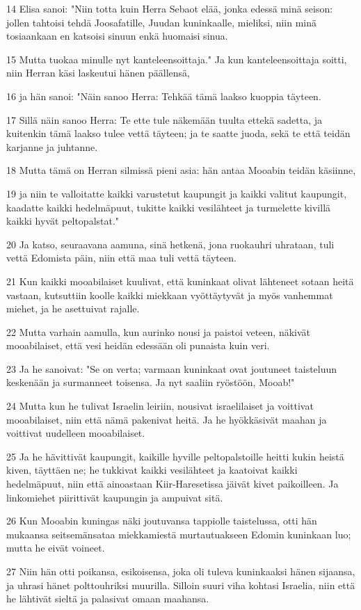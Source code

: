 \par 14 Elisa sanoi: "Niin totta kuin Herra Sebaot elää, jonka edessä minä seison: jollen tahtoisi tehdä Joosafatille, Juudan kuninkaalle, mieliksi, niin minä tosiaankaan en katsoisi sinuun enkä huomaisi sinua.
\par 15 Mutta tuokaa minulle nyt kanteleensoittaja." Ja kun kanteleensoittaja soitti, niin Herran käsi laskeutui hänen päällensä,
\par 16 ja hän sanoi: "Näin sanoo Herra: Tehkää tämä laakso kuoppia täyteen.
\par 17 Sillä näin sanoo Herra: Te ette tule näkemään tuulta ettekä sadetta, ja kuitenkin tämä laakso tulee vettä täyteen; ja te saatte juoda, sekä te että teidän karjanne ja juhtanne.
\par 18 Mutta tämä on Herran silmissä pieni asia: hän antaa Mooabin teidän käsiinne,
\par 19 ja niin te valloitatte kaikki varustetut kaupungit ja kaikki valitut kaupungit, kaadatte kaikki hedelmäpuut, tukitte kaikki vesilähteet ja turmelette kivillä kaikki hyvät peltopalstat."
\par 20 Ja katso, seuraavana aamuna, sinä hetkenä, jona ruokauhri uhrataan, tuli vettä Edomista päin, niin että maa tuli vettä täyteen.
\par 21 Kun kaikki mooabilaiset kuulivat, että kuninkaat olivat lähteneet sotaan heitä vastaan, kutsuttiin koolle kaikki miekkaan vyöttäytyvät ja myös vanhemmat miehet, ja he asettuivat rajalle.
\par 22 Mutta varhain aamulla, kun aurinko nousi ja paistoi veteen, näkivät mooabilaiset, että vesi heidän edessään oli punaista kuin veri.
\par 23 Ja he sanoivat: "Se on verta; varmaan kuninkaat ovat joutuneet taisteluun keskenään ja surmanneet toisensa. Ja nyt saaliin ryöstöön, Mooab!"
\par 24 Mutta kun he tulivat Israelin leiriin, nousivat israelilaiset ja voittivat mooabilaiset, niin että nämä pakenivat heitä. Ja he hyökkäsivät maahan ja voittivat uudelleen mooabilaiset.
\par 25 Ja he hävittivät kaupungit, kaikille hyville peltopalstoille heitti kukin heistä kiven, täyttäen ne; he tukkivat kaikki vesilähteet ja kaatoivat kaikki hedelmäpuut, niin että ainoastaan Kiir-Haresetissa jäivät kivet paikoilleen. Ja linkomiehet piirittivät kaupungin ja ampuivat sitä.
\par 26 Kun Mooabin kuningas näki joutuvansa tappiolle taistelussa, otti hän mukaansa seitsemänsataa miekkamiestä murtautuakseen Edomin kuninkaan luo; mutta he eivät voineet.
\par 27 Niin hän otti poikansa, esikoisensa, joka oli tuleva kuninkaaksi hänen sijaansa, ja uhrasi hänet polttouhriksi muurilla. Silloin suuri viha kohtasi Israelia, niin että he lähtivät sieltä ja palasivat omaan maahansa.

